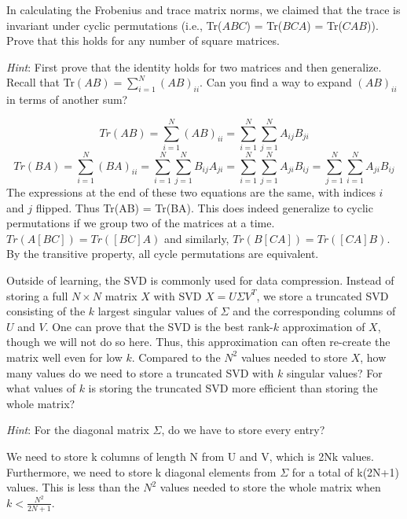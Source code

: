 \problem[5] In calculating the Frobenius and trace matrix norms, we claimed that the trace is invariant under cyclic permutations (i.e., Tr($ABC$) = Tr($BCA$) = Tr($CAB$)). Prove that this holds for any number of square matrices.

\textit{Hint}: First prove that the identity holds for two matrices and then generalize. Recall that Tr$(AB) = \sum_{i=1}^{N}(AB)_{ii}$. Can you find a way to expand $(AB)_{ii}$ in terms of another sum?

\begin{solution}
	\begin{equation}
		Tr(AB) = \sum_{i=1}^{N}(AB)_{ii} = \sum_{i=1}^{N}\sum_{j=1}^{N} A_{ij}B_{ji}
	\end{equation}
	\begin{equation}
		Tr(BA) = \sum_{i=1}^{N}(BA)_{ii} = \sum_{i=1}^{N}\sum_{j=1}^{N} B_{ij}A_{ji} = \sum_{i=1}^{N}\sum_{j=1}^{N} A_{ji}B_{ij} = \sum_{j=1}^{N}\sum_{i=1}^{N} A_{ji}B_{ij}
	\end{equation}
	The expressions at the end of these two equations are the same, with indices $i$ and $j$ flipped. Thus Tr(AB) = Tr(BA). \newline
	This does indeed generalize to cyclic permutations if we group two of the matrices at a time. $Tr(A[BC]) = Tr([BC]A)$ and similarly, $Tr(B[CA]) = Tr([CA]B)$. By the transitive property, all cycle permutations are equivalent.
\end{solution}

\problem[3] Outside of learning, the SVD is commonly used for data compression. Instead of storing a full $N \times N$ matrix $X$ with SVD $X = U\Sigma V^T$, we store a truncated SVD consisting of the $k$ largest singular values of $\Sigma$ and the corresponding columns of $U$ and $V$. One can prove that the SVD is the best rank-$k$ approximation of $X$, though we will not do so here. Thus, this approximation can often re-create the matrix well even for low $k$. Compared to the $N^2$ values needed to store $X$, how many values do we need to store a truncated SVD with $k$ singular values? For what values of $k$ is storing the truncated SVD more efficient than storing the whole matrix?

\textit{Hint}: For the diagonal matrix $\Sigma$, do we have to store every entry?

\begin{solution}
	We need to store k columns of length N from U and V, which is 2Nk values. Furthermore, we need to store k diagonal elements from $\Sigma$ for a total of k(2N+1) values. This is less than the $N^2$ values needed to store the whole matrix when $ k < \frac{N^2}{2N+1}$.
\end{solution}

